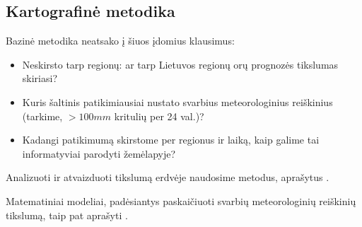 \documentclass{article}
\begin{document}
\subsection{Kartografinė metodika}

Bazinė metodika neatsako į šiuos įdomius klausimus:

\begin{itemize}
    \item Neskirsto tarp regionų: ar tarp Lietuvos regionų orų prognozės
        tikslumas skiriasi?
    \item Kuris šaltinis patikimiausiai nustato svarbius meteorologinius
        reiškinius (tarkime, $>100mm$ kritulių per 24 val.)?
    \item Kadangi patikimumą skirstome per regionus ir laiką, kaip galime tai
        informatyviai parodyti žemėlapyje?
\end{itemize}

Analizuoti ir atvaizduoti tikslumą erdvėje naudosime metodus, aprašytus
\cite{verification2015}.

Matematiniai modeliai, padėsiantys paskaičiuoti svarbių meteorologinių
reiškinių tikslumą, taip pat aprašyti \cite{verification2015}.

\printbibliography
\end{document}
